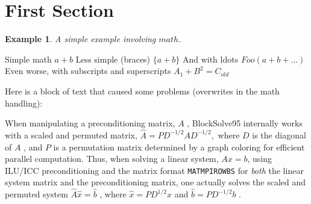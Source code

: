 \documentclass{article}
\begin{document}
\newtheorem{example}{Example}[section]

\section{First Section}

\begin{example}
  A simple example involving \(math\).
\end{example}

Simple math
\( a + b \)
Less simple (braces)
\( \{ a + b \}\)
And with ldots
\( Foo( a + b + \ldots ) \)
Even worse, with subscripts and superscripts 
\( A_1 + B^2 = C_{old} \)

Here is a block of text that caused some problems (overwrites in the
math handling):

When manipulating a preconditioning matrix, \( A \) , BlockSolve95
internally works with a scaled and permuted matrix, \( \hat{A} = P
D^{-1/2} A D^{-1/2},\) where \( D \) is the diagonal of \( A \) , and \( P \) is a
permutation matrix determined by a graph coloring for efficient
parallel computation.  Thus, when solving a linear system, \( Ax=b \),
using ILU/ICC preconditioning and the matrix format {\tt MATMPIROWBS}
for {\em both} the linear system matrix and the preconditioning
matrix, one actually solves the scaled and permuted system \( \hat{A}
\hat{x} = \hat{b} \) , where \( \hat{x} = P D^{1/2} x \) and \(\hat{b} = P
D^{-1/2} b\) . 
\end{document}
